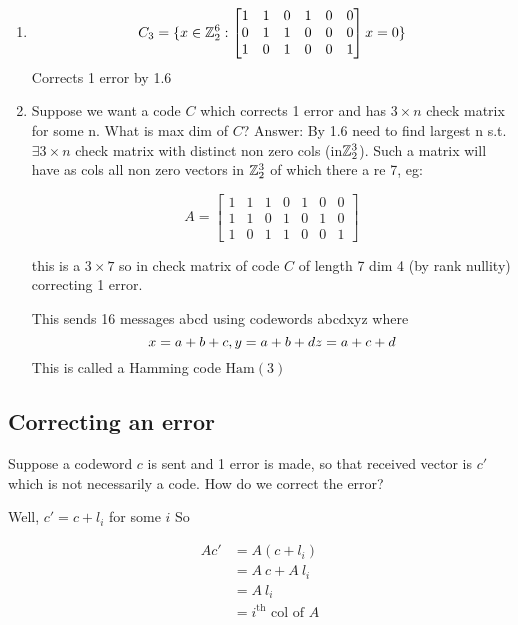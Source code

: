 \documentclass[]{article}
\theoremstyle{definition}
\theoremstyle{remark}
\numberwithin{equation}{section}
\begin{document}
		\begin{enumerate}
		\item 
		\[C_3 = \{
			x \in \mathbb{Z}_2^6 : \begin{bmatrix}
			1 & 1 & 0 & 1 & 0 & 0 \\
			0 & 1 & 1 & 0 & 0 & 0 \\
			1 & 0 & 1 & 0 & 0 & 1
			\end{bmatrix}x = 0
		\}\]
		Corrects 1 error by 1.6

		\item Suppose we want a code $C$ which corrects 1 error and has $3 \times n$ check matrix for some n. What is max dim of $C$?
		Answer:
		By 1.6 need to find largest n s.t. $\exists 3 \times n $ check matrix with distinct non zero cols (in$\mathbb{Z}_2^3$). Such a matrix will have as cols all non zero vectors in $\mathbb{Z}_2^3$ of which there a re 7, eg:

		\[
		A = \begin{bmatrix}
			1 & 1 & 1 & 0 & 1 & 0 & 0 \\
			1 & 1 & 0 & 1 & 0 & 1 & 0 \\
			1 & 0 & 1 & 1 & 0 & 0 & 1
			\end{bmatrix}
		\]

		this is a $3\times 7$ so in check matrix of code $C$ of length 7 dim 4 (by rank nullity) correcting 1 error.

		This sends 16 messages abcd using codewords abcdxyz where 
		\[
			x = a + b + c,\\
			y = a +b + d \\
			z = a + c + d
		\]
		This is called a Hamming code $\text{Ham}(3)$

		\end{enumerate}
	\subsection{Correcting an error}
		Suppose a codeword $c$ is sent and 1 error is made, so that received vector is $c'$ which is not necessarily a code. How do we correct the error?

		Well, $c' = c + l_i$ for some $i$
		So

		\begin{align*}
			Ac' &= A(c+l_i) \\
				&= A\ c + A\ l_i \\
				&= A\ l_i \\
				&= \text{$i^\text{th}$ col of $A$}
		\end{align*}
\end{document}
